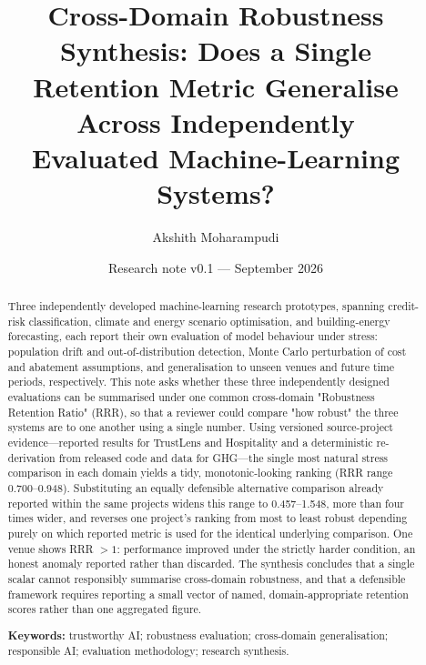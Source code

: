 \documentclass[11pt]{article}
\title{\textbf{Cross-Domain Robustness Synthesis: Does a Single\\ Retention Metric Generalise Across Independently\\ Evaluated Machine-Learning Systems?}}
\author[1]{Akshith Moharampudi}
\affil[1]{Independent Research Portfolio; MComp Computer Science, Middlesex University London}
\date{Research note v0.1 --- September 2026}
\begin{document}
\maketitle

\begin{center}
\end{center}

\vspace{0.5cm}

\begin{abstract}
Three independently developed machine-learning research prototypes, spanning credit-risk classification, climate and energy scenario optimisation, and building-energy forecasting, each report their own evaluation of model behaviour under stress: population drift and out-of-distribution detection, Monte Carlo perturbation of cost and abatement assumptions, and generalisation to unseen venues and future time periods, respectively. This note asks whether these three independently designed evaluations can be summarised under one common cross-domain "Robustness Retention Ratio" (RRR), so that a reviewer could compare "how robust" the three systems are to one another using a single number. Using versioned source-project evidence---reported results for TrustLens and Hospitality and a deterministic re-derivation from released code and data for GHG---the single most natural stress comparison in each domain yields a tidy, monotonic-looking ranking (RRR range 0.700--0.948). Substituting an equally defensible alternative comparison already reported within the same projects widens this range to 0.457--1.548, more than four times wider, and reverses one project's ranking from most to least robust depending purely on which reported metric is used for the identical underlying comparison. One venue shows RRR $>1$: performance improved under the strictly harder condition, an honest anomaly reported rather than discarded. The synthesis concludes that a single scalar cannot responsibly summarise cross-domain robustness, and that a defensible framework requires reporting a small vector of named, domain-appropriate retention scores rather than one aggregated figure.

\vspace{0.3cm}
\noindent\textbf{Keywords:} trustworthy AI; robustness evaluation; cross-domain generalisation; responsible AI; evaluation methodology; research synthesis.
\end{abstract}
\end{document}
